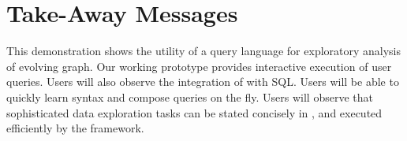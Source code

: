 \section{Take-Away Messages}
\label{sec:conc}

This demonstration shows the utility of a query language for
exploratory analysis of evolving graph.  Our working prototype
provides interactive execution of user queries.  Users will
also observe the integration of \ql with SQL.  Users will be
able to quickly learn \ql syntax and compose queries on the fly.
Users will observe that sophisticated data exploration tasks can be
stated concisely in \ql, and executed efficiently by the framework.

